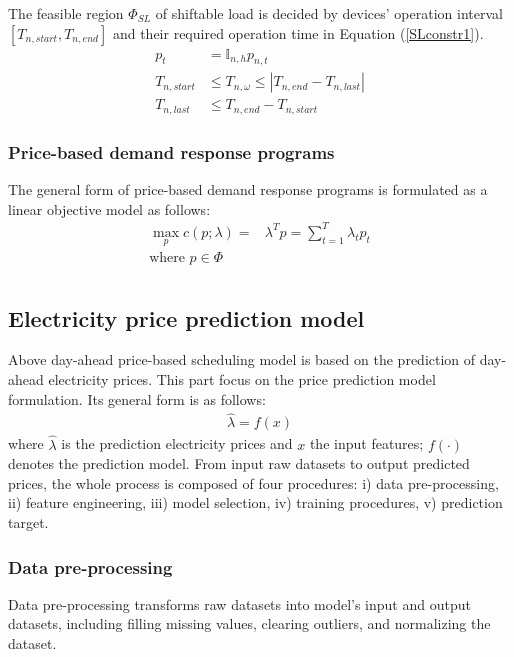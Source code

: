 \documentclass[journal]{IEEEtran}
\begin{document}
The feasible region $\Phi_{SL}$ of shiftable load is decided by devices' operation interval $[T_{n, start}, T_{n, end}]$ and their required operation time in Equation (\ref{SLconstr1}).
\begin{equation}
  \label{SLconstr1}
  \begin{aligned}
    p_t &= \mathbb{I} _{n,h} p_{n, t} \\
    T_{n, start} &\leq T_{n, \omega} \leq |T_{n, end}-T_{n, last}| \\
    T_{n, last} &\leq T_{n, end} - T_{n, start}
  \end{aligned}
\end{equation}


\subsubsection{Price-based demand response programs}
The general form of price-based demand response programs is formulated as a linear objective model as follows:
\begin{equation}
  \label{PriceDR}
  \begin{aligned}
    \max_{p} c(p; \lambda) = &\lambda^T p = \sum_{t=1}^T \lambda_t p_t \\
    \text{where }  p \in \Phi \\
  \end{aligned}
\end{equation}

\subsection{Electricity price prediction model}
Above day-ahead price-based scheduling model is based on the prediction of day-ahead electricity prices. This part focus on the price prediction model formulation. Its general form is as follows:
\begin{equation}
  \label{Prediction}
  \begin{aligned}
    \hat{\lambda} = f(x)
  \end{aligned}
\end{equation}
where $\hat{\lambda}$ is the prediction electricity prices and $x$ the input features; $f(\cdot)$ denotes the prediction model. From input raw datasets to output predicted prices, the whole process is composed of four procedures: i) data pre-processing, ii) feature engineering, iii) model selection, iv) training procedures, v) prediction target.

\subsubsection{Data pre-processing}
Data pre-processing transforms raw datasets into model's input and output datasets, including filling missing values,  clearing outliers, and normalizing the dataset. 
\end{document}

